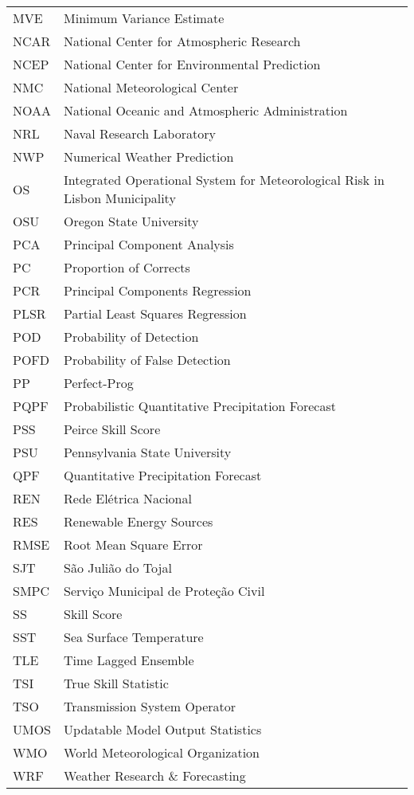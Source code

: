 \begin{longtable}{ll}
MVE     &  Minimum Variance Estimate \\
NCAR    &  National Center for Atmospheric Research \\
NCEP    &  National Center for Environmental Prediction \\
NMC     &  National Meteorological Center \\
NOAA    &  National Oceanic and Atmospheric Administration \\
NRL     &  Naval Research Laboratory \\
NWP     &  Numerical Weather Prediction  \\
OS      &  Integrated Operational System for Meteorological Risk in Lisbon Municipality \\
OSU     &  Oregon State University \\
PCA     &  Principal Component Analysis \\
PC      &  Proportion of Corrects \\
PCR     &  Principal Components Regression \\
PLSR    &  Partial Least Squares Regression \\
POD     &  Probability of Detection \\
POFD    &  Probability of False Detection \\
PP      &  Perfect-Prog \\
PQPF    &  Probabilistic Quantitative Precipitation Forecast  \\
PSS     &  Peirce Skill Score \\
PSU     &  Pennsylvania State University \\
QPF     &  Quantitative Precipitation Forecast \\
REN     &  Rede El\'{e}trica Nacional \\
RES     &  Renewable Energy Sources \\
RMSE    &  Root Mean Square Error \\
SJT     &  S\~{a}o Juli\~{a}o do Tojal \\
SMPC    &  Servi\c{c}o Municipal de Prote\c{c}\~{a}o Civil \\
SS      &  Skill Score \\
SST     &  Sea Surface Temperature \\
TLE     &  Time Lagged Ensemble \\
TSI     &  True Skill Statistic \\
TSO     &  Transmission System Operator \\
UMOS    &  Updatable Model Output Statistics \\
WMO     &  World Meteorological Organization \\
WRF     &  Weather Research \& Forecasting \\
\end{longtable}

